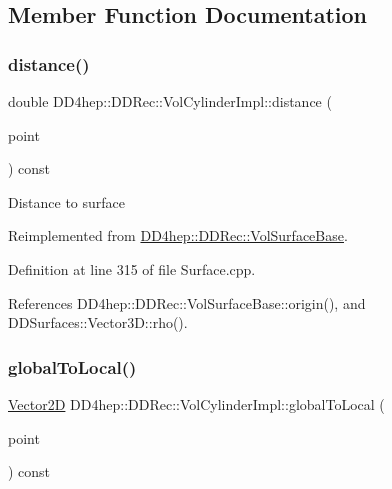 \subsection{Member Function Documentation}
\hypertarget{class_d_d4hep_1_1_d_d_rec_1_1_vol_cylinder_impl_a34013e2fc45f1312dea83210f9c30751}{}\label{class_d_d4hep_1_1_d_d_rec_1_1_vol_cylinder_impl_a34013e2fc45f1312dea83210f9c30751} 
\subsubsection{\texorpdfstring{distance()}{distance()}}
{\footnotesize\ttfamily double D\+D4hep\+::\+D\+D\+Rec\+::\+Vol\+Cylinder\+Impl\+::distance (\begin{DoxyParamCaption}\item[{const \hyperlink{class_d_d_surfaces_1_1_vector3_d}{Vector3D} \&}]{point }\end{DoxyParamCaption}) const\hspace{0.3cm}{\ttfamily [virtual]}}

Distance to surface 

Reimplemented from \hyperlink{class_d_d4hep_1_1_d_d_rec_1_1_vol_surface_base_aefb278e0429219871c47b602a2593fef}{D\+D4hep\+::\+D\+D\+Rec\+::\+Vol\+Surface\+Base}.



Definition at line 315 of file Surface.\+cpp.



References D\+D4hep\+::\+D\+D\+Rec\+::\+Vol\+Surface\+Base\+::origin(), and D\+D\+Surfaces\+::\+Vector3\+D\+::rho().

\hypertarget{class_d_d4hep_1_1_d_d_rec_1_1_vol_cylinder_impl_a5bcd55a843e711dff3e03eb3e14887bd}{}\label{class_d_d4hep_1_1_d_d_rec_1_1_vol_cylinder_impl_a5bcd55a843e711dff3e03eb3e14887bd} 
\subsubsection{\texorpdfstring{global\+To\+Local()}{globalToLocal()}}
{\footnotesize\ttfamily \hyperlink{class_d_d_surfaces_1_1_vector2_d}{Vector2D} D\+D4hep\+::\+D\+D\+Rec\+::\+Vol\+Cylinder\+Impl\+::global\+To\+Local (\begin{DoxyParamCaption}\item[{const \hyperlink{class_d_d_surfaces_1_1_vector3_d}{Vector3D} \&}]{point }\end{DoxyParamCaption}) const\hspace{0.3cm}{\ttfamily [virtual]}}

